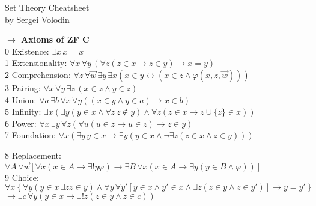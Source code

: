 \documentclass[9pt]{article}
\newcommand{\mytitle}[1]{ {\bf $\rightarrow$ #1}\\}
\begin{document}
\begin{center}
	{\large Set Theory Cheatsheet}\\
	by Sergei Volodin
\end{center}
\setlength\multicolsep{0pt}
\begin{multicols}{2}
\mytitle{Axioms of Z{\color{blue}F}{\color{red} C}}
0 Existence: $\exists x\, x=x$\\
1 Extensionality: $\forall x\,\forall y\,\left(\forall z \left(z\in x\to z\in y\right)\to x=y \right)$\\
2 Comprehension: $\forall z\,\forall \vec{w}\,\exists y\,\exists x\left(x\in y\leftrightarrow \left(x\in z \wedge\varphi(x,z,\vec{w})\right)\right)$\\
3 Pairing: $\forall x\,\forall y\,\exists z\,\left(x\in z\wedge y\in z\right)$\\
4 Union: $\forall a\,\exists b\,\forall x\,\forall y\left((x\in y\wedge y\in a)\to x\in b\right)$\\
5 Infinity: $\exists x\left(\exists y(y\in x\wedge\forall z\,z\notin y)\wedge \forall z(z\in x\to z\cup \{z\}\in x)\right)$\\
6 Power: $\forall x\,\exists y\,\forall z\left(\forall u(u\in z\to u\in z)\to z\in y\right)$\\
7 Foundation: $\forall x\left(\exists y\,y\in x\to\exists y(y\in x\wedge \neg \exists z(z\in x\wedge z\in y))\right)$
\end{multicols}
{\color{blue}8 Replacement:} $\forall A\,\forall\vec{w}\left[\forall x(x\in A\to\exists !y\varphi)\to\exists B\,\forall x(x\in A\to \exists y(y\in B\wedge \varphi))\right]$\\
{\color{red}9 Choice:} $\forall x \left\{\forall y(y\in x\,\exists z z\in y)\wedge \forall y\,\forall y'\left[y\in x\wedge y'\in x\wedge \exists z (z\in y\wedge z\in y')\right]\to y=y'\right\}$ $\to\exists c\,\forall y(y\in x\to\exists !z(z\in y\wedge z\in c))$
\noindent\makebox[\linewidth]{\rule{\paperwidth}{0.1pt}}
\end{document}
